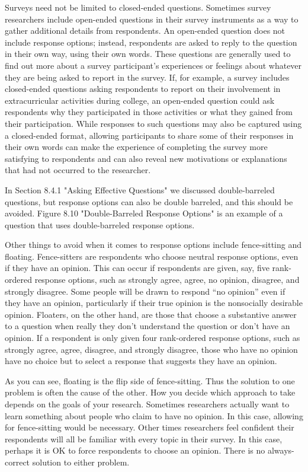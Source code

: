 Surveys need not be limited to closed-ended questions. Sometimes survey researchers include open-ended questions in their survey instruments as a way to gather additional details from respondents. An open-ended question does not include response options; instead, respondents are asked to reply to the question in their own way, using their own words. These questions are generally used to find out more about a survey participant’s experiences or feelings about whatever they are being asked to report in the survey. If, for example, a survey includes closed-ended questions asking respondents to report on their involvement in extracurricular activities during college, an open-ended question could ask respondents why they participated in those activities or what they gained from their participation. While responses to such questions may also be captured using a closed-ended format, allowing participants to share some of their responses in their own words can make the experience of completing the survey more satisfying to respondents and can also reveal new motivations or explanations that had not occurred to the researcher.

In Section 8.4.1 "Asking Effective Questions" we discussed double-barreled questions, but response options can also be double barreled, and this should be avoided. Figure 8.10 "Double-Barreled Response Options" is an example of a question that uses double-barreled response options.

Other things to avoid when it comes to response options include fence-sitting and floating. Fence-sitters are respondents who choose neutral response options, even if they have an opinion. This can occur if respondents are given, say, five rank-ordered response options, such as strongly agree, agree, no opinion, disagree, and strongly disagree. Some people will be drawn to respond “no opinion” even if they have an opinion, particularly if their true opinion is the nonsocially desirable opinion. Floaters, on the other hand, are those that choose a substantive answer to a question when really they don’t understand the question or don’t have an opinion. If a respondent is only given four rank-ordered response options, such as strongly agree, agree, disagree, and strongly disagree, those who have no opinion have no choice but to select a response that suggests they have an opinion.

As you can see, floating is the flip side of fence-sitting. Thus the solution to one problem is often the cause of the other. How you decide which approach to take depends on the goals of your research. Sometimes researchers actually want to learn something about people who claim to have no opinion. In this case, allowing for fence-sitting would be necessary. Other times researchers feel confident their respondents will all be familiar with every topic in their survey. In this case, perhaps it is OK to force respondents to choose an opinion. There is no always-correct solution to either problem.

